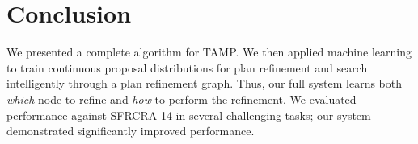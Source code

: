 \section{Conclusion}
We presented a complete algorithm for TAMP. We then applied machine learning to train
continuous proposal distributions for plan refinement and search intelligently through
a plan refinement graph. Thus, our full system learns both \emph{which} node to refine
and \emph{how} to perform the refinement. We evaluated performance against SFRCRA-14 in
several challenging tasks; our system demonstrated significantly improved performance.
